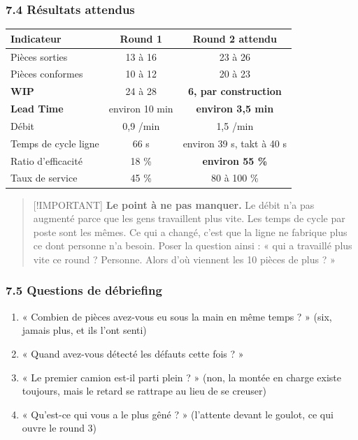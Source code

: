 \documentclass[
]{article}
\newcounter{none} %
\providecommand{\tightlist}{%
  \setlength{\itemsep}{0pt}\setlength{\parskip}{0pt}}
\begin{document}
\subsubsection{7.4 Résultats attendus}\label{ruxe9sultats-attendus-1}

{\def\LTcaptype{none} %
\begin{longtable}[]{@{}lcc@{}}
\toprule\noalign{}
Indicateur & Round 1 & Round 2 attendu \\
\midrule\noalign{}
\endhead
\bottomrule\noalign{}
\endlastfoot
Pièces sorties & 13 à 16 & 23 à 26 \\
Pièces conformes & 10 à 12 & 20 à 23 \\
\textbf{WIP} & 24 à 28 & \textbf{6, par construction} \\
\textbf{Lead Time} & environ 10 min & \textbf{environ 3,5 min} \\
Débit & 0,9 /min & 1,5 /min \\
Temps de cycle ligne & 66 s & environ 39 s, takt à 40 s \\
Ratio d'efficacité & 18 \% & \textbf{environ 55 \%} \\
Taux de service & 45 \% & 80 à 100 \% \\
\end{longtable}
}

\begin{quote}
{[}!IMPORTANT{]} \textbf{Le point à ne pas manquer.} Le débit n'a pas
augmenté parce que les gens travaillent plus vite. Les temps de cycle
par poste sont les mêmes. Ce qui a changé, c'est que la ligne ne
fabrique plus ce dont personne n'a besoin. Poser la question ainsi : «
qui a travaillé plus vite ce round ? Personne. Alors d'où viennent les
10 pièces de plus ? »
\end{quote}

\subsubsection{7.5 Questions de
débriefing}\label{questions-de-duxe9briefing-1}

\begin{enumerate}
\def\labelenumi{\arabic{enumi}.}
\tightlist
\item
  « Combien de pièces avez-vous eu sous la main en même temps ? » (six,
  jamais plus, et ils l'ont senti)
\item
  « Quand avez-vous détecté les défauts cette fois ? »
\item
  « Le premier camion est-il parti plein ? » (non, la montée en charge
  existe toujours, mais le retard se rattrape au lieu de se creuser)
\item
  « Qu'est-ce qui vous a le plus gêné ? » (l'attente devant le goulot,
  ce qui ouvre le round 3)
\end{enumerate}
\end{document}
